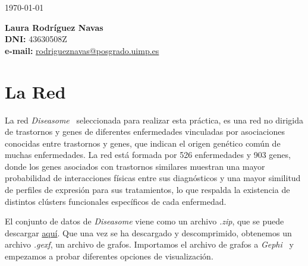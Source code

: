 \documentclass{uimppracticas}
\begin{document}
	
\frontmatter


\begin{center}
\large \today
\end{center}

\vspace{40mm}

\begin{flushright}
 	{\bf Laura Rodríguez Navas}\\
 	\textbf{DNI:} 43630508Z\\
 	\textbf{e-mail:} \href{rodrigueznavas@posgrado.uimp.es}{rodrigueznavas@posgrado.uimp.es}
\end{flushright}

\newpage



\mainmatter

\setlength\parskip{2.5ex}

\section*{La Red}

La red \textit{Diseasome}~\cite{Goh8685} seleccionada para realizar esta práctica, es una red no dirigida de trastornos y genes de diferentes enfermedades vinculadas por asociaciones conocidas entre trastornos y genes, que indican el origen genético común de muchas enfermedades. La red está formada por 526 enfermedades y 903 genes, donde los genes asociados con trastornos similares muestran una mayor probabilidad de interacciones físicas entre sus diagnósticos y una mayor similitud de perfiles de expresión para sus tratamientos, lo que respalda la existencia de distintos clústers funcionales específicos de cada enfermedad. 

El conjunto de datos de \textit{Diseasome} viene como un archivo \textit{.zip}, que se puede descargar \href{http://gephi.org/datasets/diseasome.gexf.zip}{aquí}. Que una vez se ha descargado y descomprimido, obtenemos un archivo \textit{.gexf}, un archivo de grafos. Importamos el archivo de grafos a \textit{Gephi}~\cite{Gephi} y empezamos a probar diferentes opciones de visualización.
\end{document}
